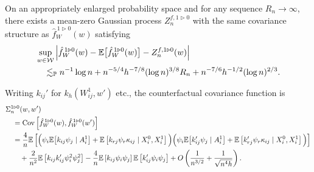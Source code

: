 \begin{lemma}
  \label{lem:counterfactual_sa}

  On an appropriately enlarged probability space
  and for any sequence $R_n \to \infty$,
  there exists a mean-zero Gaussian process
  $Z_n^{f, 1 \triangleright 0}$
  with the same covariance structure as
  $\hat f_W^{\,1 \triangleright 0}(w)$ satisfying
  \begin{align*}
    &\sup_{w \in \mathcal{W}}
    \left|
    \hat f_W^{\,1 \triangleright 0}(w)
    - \mathbb{E}\big[\hat f_W^{\,1 \triangleright 0}(w)\big]
    - Z_n^{f, 1 \triangleright 0}(w)
    \right| \\
    &\quad\lesssim_{\mathbb{P}}
    n^{-1} \log n
    + n^{-5/4} h^{-7/8} (\log n)^{3/8} R_n
    + n^{-7/6} h^{-1/2} (\log n)^{2/3}.
  \end{align*}

\end{lemma}

\begin{lemma}
  \label{lem:counterfactual_covariance_structure}

  Writing $k_{ij}'$ for $k_h(W_{ij}^1, w')$ etc.,
  the counterfactual covariance function is
  \begin{align*}
    &\Sigma_n^{1 \triangleright 0}(w,w') \\
    &\quad=
    \operatorname{Cov}\left[
      \hat f_W^{\,1 \triangleright 0}(w),
      \hat f_W^{\,1 \triangleright 0}(w')
    \right] \\
    &\quad=
    \frac{4}{n}
    \mathbb{E}\left[
      \Big(
      \psi_i
      \mathbb{E}\big[
        k_{ij} \psi_j
        \mid A_i^1
        \big]
      + \mathbb{E}\left[
        k_{r j} \psi_r
        \kappa_{ij}
        \mid X_i^0, X_i^1
      \right]
      \Big)
      \Big(
      \psi_i
      \mathbb{E}\big[
        k_{ij}' \psi_j
        \mid A_i^1
        \big]
      + \mathbb{E}\left[
        k_{r j}' \psi_r \kappa_{ij}
        \mid X_i^0, X_i^1
      \right]
      \Big)
    \right] \\
    &\qquad+
    \frac{2}{n^2}
    \mathbb{E}\left[
      k_{ij} k_{ij}'
      \psi_i^2 \psi_j^2
    \right]
    - \frac{4}{n}
    \mathbb{E}\left[
      k_{ij} \psi_i \psi_j
    \right]
    \mathbb{E}\left[
      k_{ij}' \psi_i \psi_j
    \right]
    + O\left( \frac{1}{n^{3/2}} + \frac{1}{\sqrt{n^4h}} \right).
  \end{align*}

\end{lemma}

